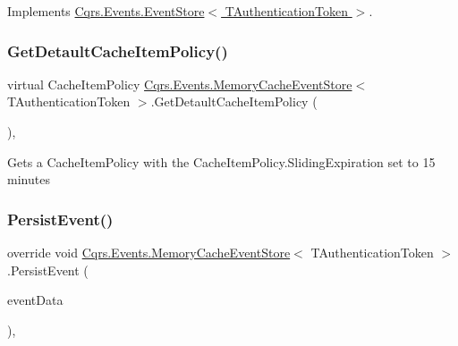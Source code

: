 Implements \hyperlink{classCqrs_1_1Events_1_1EventStore_a0096646f5dff730b0041b9469719c420_a0096646f5dff730b0041b9469719c420}{Cqrs.\+Events.\+Event\+Store$<$ T\+Authentication\+Token $>$}.

\mbox{\label{classCqrs_1_1Events_1_1MemoryCacheEventStore_a2dddf1e1c4c737ad393655ee990953b3_a2dddf1e1c4c737ad393655ee990953b3}} 
\subsubsection{\texorpdfstring{Get\+Detault\+Cache\+Item\+Policy()}{GetDetaultCacheItemPolicy()}}
{\footnotesize\ttfamily virtual Cache\+Item\+Policy \hyperlink{classCqrs_1_1Events_1_1MemoryCacheEventStore}{Cqrs.\+Events.\+Memory\+Cache\+Event\+Store}$<$ T\+Authentication\+Token $>$.Get\+Detault\+Cache\+Item\+Policy (\begin{DoxyParamCaption}{ }\end{DoxyParamCaption})\hspace{0.3cm}{\ttfamily [protected]}, {\ttfamily [virtual]}}



Get\textquotesingle{}s a Cache\+Item\+Policy with the Cache\+Item\+Policy.\+Sliding\+Expiration set to 15 minutes 

\mbox{\label{classCqrs_1_1Events_1_1MemoryCacheEventStore_a9b1a1aaab34770bd68ebcedca0fc40b0_a9b1a1aaab34770bd68ebcedca0fc40b0}} 
\subsubsection{\texorpdfstring{Persist\+Event()}{PersistEvent()}}
{\footnotesize\ttfamily override void \hyperlink{classCqrs_1_1Events_1_1MemoryCacheEventStore}{Cqrs.\+Events.\+Memory\+Cache\+Event\+Store}$<$ T\+Authentication\+Token $>$.Persist\+Event (\begin{DoxyParamCaption}\item[{\hyperlink{classCqrs_1_1Events_1_1EventData}{Event\+Data}}]{event\+Data }\end{DoxyParamCaption})\hspace{0.3cm}{\ttfamily [protected]}, {\ttfamily [virtual]}}



